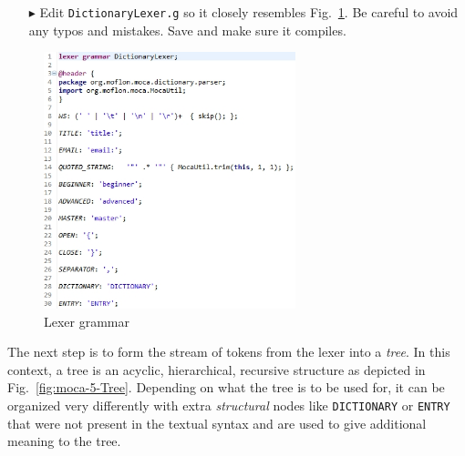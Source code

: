 \begin{enumerate}
\item[$\blacktriangleright$] Edit \texttt{DictionaryLexer.g} so it closely resembles Fig.~\ref{fig:moca-6-lexer}.
Be careful to avoid any typos and mistakes.  Save and make sure it compiles.  
\end{enumerate}

\begin{figure}[!htbp]
\begin{center}
 \includegraphics[width=0.65\textwidth]{pics/moca/2TextToMocaTree/6-lexer}
  \caption{Lexer grammar}
  \label{fig:moca-6-lexer}
\end{center}
\end{figure}

The next step is to form the stream of tokens from the lexer into a \emph{tree}.
In this context, a tree is an acyclic, hierarchical, recursive structure as depicted in Fig.~\ref{fig:moca-5-Tree}.
Depending on what the tree is to be used for, it can be organized very differently with extra \emph{structural} nodes like \texttt{DICTIONARY} or \texttt{ENTRY} that were not present in the textual syntax and are used to give additional meaning to the tree. 


